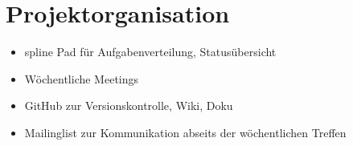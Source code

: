 \section{Projektorganisation}
    \begin{itemize}
        \item spline Pad für Aufgabenverteilung, Statusübersicht
        \item Wöchentliche Meetings
        \item GitHub zur Versionskontrolle, Wiki, Doku
        \item Mailinglist zur Kommunikation abseits der wöchentlichen Treffen
    \end{itemize}